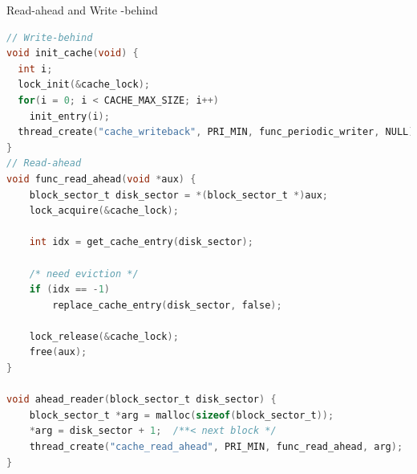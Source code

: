 \documentclass[10pt]{beamer}
\begin{document}
\begin{frame}[fragile]{Read-ahead and Write -behind}
\begin{lstlisting}[language=C]
// Write-behind
void init_cache(void) {
  int i;
  lock_init(&cache_lock);
  for(i = 0; i < CACHE_MAX_SIZE; i++)
    init_entry(i);
  thread_create("cache_writeback", PRI_MIN, func_periodic_writer, NULL);
}
// Read-ahead
void func_read_ahead(void *aux) {
    block_sector_t disk_sector = *(block_sector_t *)aux;
    lock_acquire(&cache_lock);

    int idx = get_cache_entry(disk_sector);

    /* need eviction */
    if (idx == -1)
        replace_cache_entry(disk_sector, false);
    
    lock_release(&cache_lock);
    free(aux);
}

void ahead_reader(block_sector_t disk_sector) {
    block_sector_t *arg = malloc(sizeof(block_sector_t));
    *arg = disk_sector + 1;  /**< next block */
    thread_create("cache_read_ahead", PRI_MIN, func_read_ahead, arg);
}

\end{lstlisting}
\end{frame}
\end{document}
